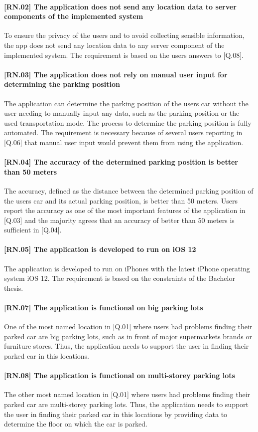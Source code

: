 \paragraph{[RN.02] The application does not send any location data to server components of the implemented system}
To ensure the privacy of the users and to avoid collecting sensible information, the app does not send any location data to any server component of the implemented system. The requirement is based on the users answers to [Q.08].

\paragraph{[RN.03] The application does not rely on manual user input for determining the parking position}
The application can determine the parking position of the users car without the user needing to manually input any data, such as the parking position or the used transportation mode. The process to determine the parking position is fully automated. The requirement is necessary because of several users reporting in [Q.06] that manual user input would prevent them from using the application.

\paragraph{[RN.04] The accuracy of the determined parking position is better than 50 meters}
The accuracy, defined as the distance between the determined parking position of the users car and its actual parking position, is better than 50 meters. Users report the accuracy as one of the most important features of the application in [Q.03] and the majority agrees that an accuracy of better than 50 meters is sufficient in [Q.04]. 

\paragraph{[RN.05] The application is developed to run on iOS 12}
The application is developed to run on iPhones with the latest iPhone operating system iOS 12. The requirement is based on the constraints of the Bachelor thesis. 

\paragraph{[RN.07] The application is functional on big parking lots}
One of the most named location in [Q.01] where users had problems finding their parked car are big parking lots, such as in front of major supermarkets brands or furniture stores. Thus, the application needs to support the user in finding their parked car in this locations.

\paragraph{[RN.08] The application is functional on multi-storey parking lots}
The other most named location in [Q.01] where users had problems finding their parked car are multi-storey parking lots. Thus, the application needs to support the user in finding their parked car in this locations by providing data to determine the floor on which the car is parked. 